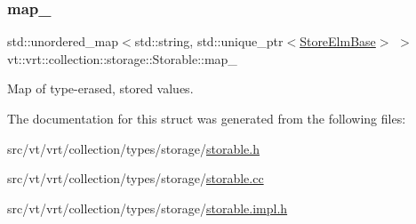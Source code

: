 \subsubsection{\texorpdfstring{map\+\_\+}{map\_}}
{\footnotesize\ttfamily std\+::unordered\+\_\+map$<$std\+::string, std\+::unique\+\_\+ptr$<$\hyperlink{structvt_1_1vrt_1_1collection_1_1storage_1_1_store_elm_base}{Store\+Elm\+Base}$>$ $>$ vt\+::vrt\+::collection\+::storage\+::\+Storable\+::map\+\_\+\hspace{0.3cm}{\ttfamily [private]}}



Map of type-\/erased, stored values. 



The documentation for this struct was generated from the following files\+:\begin{DoxyCompactItemize}
\item 
src/vt/vrt/collection/types/storage/\hyperlink{storable_8h}{storable.\+h}\item 
src/vt/vrt/collection/types/storage/\hyperlink{storable_8cc}{storable.\+cc}\item 
src/vt/vrt/collection/types/storage/\hyperlink{storable_8impl_8h}{storable.\+impl.\+h}\end{DoxyCompactItemize}
